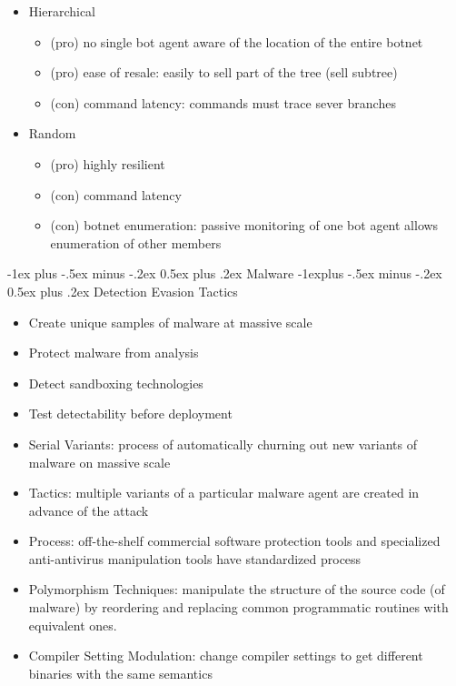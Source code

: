 \documentclass[a4paper,twocolumn]{article}
\makeatletter
\newenvironment{itemization}[1][\small]{%
    \begin{itemize}[leftmargin=*]
            #1
        }{%
    \end{itemize}
}
\renewcommand{\section}{%
    \@startsection{section}{1}{0mm}%
    {-1ex plus -.5ex minus -.2ex}%
    {0.5ex plus .2ex}%
    {\normalfont\normalsize\bfseries\sectionrule{12pt}{0.4pt}{0pt}{0pt}}
}
\renewcommand{\subsection}{%
    \@startsection{subsection}{2}{0mm}%
    {-1explus -.5ex minus -.2ex}%
    {0.5ex plus .2ex}%
    {\normalfont\small\bfseries}
}
\makeatother
\begin{document}
\begin{footnotesize}
\begin{itemization}
\item Hierarchical
\begin{itemization}
\item (pro) no single bot agent aware of the location of the entire botnet
\item (pro) ease of resale: easily to sell part of the tree (sell subtree)
\item (con) command latency: commands must trace sever branches
\end{itemization}

\item Random
\begin{itemization}
\item (pro) highly resilient
\item (con) command latency
\item (con) botnet enumeration: passive monitoring of one bot agent allows enumeration of other members
\end{itemization}
\end{itemization}

\section{Malware}
\subsection{Detection Evasion Tactics}
\begin{itemization}
\item Create unique samples of malware at massive scale
\item Protect malware from analysis
\item Detect sandboxing technologies
\item Test detectability before deployment
\item Serial Variants: process of automatically churning out new variants of malware on massive scale
\item Tactics: multiple variants of a particular malware agent are created in advance of the attack
\item Process: off-the-shelf commercial software protection tools and specialized anti-antivirus manipulation tools have standardized process
\item Polymorphism Techniques: manipulate the structure of the source code (of malware) by reordering and replacing common programmatic routines with equivalent ones.
\item Compiler Setting Modulation: change compiler settings to get different binaries with the same semantics
\end{itemization}


\end{footnotesize}
\end{document}
